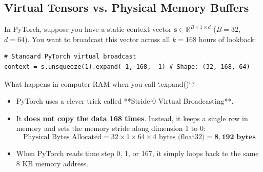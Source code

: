 \documentclass[11pt,a4paper]{article}
\begin{document}
\subsection{Virtual Tensors vs. Physical Memory Buffers}
In PyTorch, suppose you have a static context vector $\mathbf{s} \in \mathbb{R}^{B \times 1 \times d}$ ($B=32$, $d=64$).
You want to broadcast this vector across all $k=168$ hours of lookback:
\begin{lstlisting}
# Standard PyTorch virtual broadcast
context = s.unsqueeze(1).expand(-1, 168, -1) # Shape: (32, 168, 64)
\end{lstlisting}

What happens in computer RAM when you call `.expand()`?
\begin{itemize}
    \item PyTorch uses a clever trick called **Stride-0 Virtual Broadcasting**.
    \item It \textbf{does not copy the data 168 times}. Instead, it keeps a single row in memory and sets the memory stride along dimension 1 to $0$:
    \begin{equation}
        \text{Physical Bytes Allocated} = 32 \times 1 \times 64 \times 4\text{ bytes (float32)} = \mathbf{8,192\text{ bytes}}
    \end{equation}
    \item When PyTorch reads time step 0, 1, or 167, it simply loops back to the same 8 KB memory address.
\end{itemize}
\end{document}
